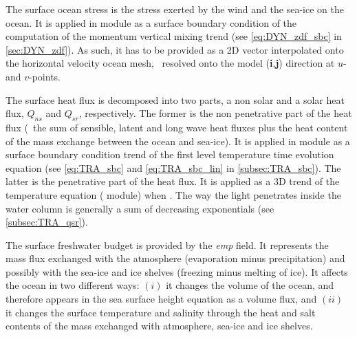 \documentclass[../main/NEMO_manual]{subfiles}
\begin{document}
The surface ocean stress is the stress exerted by the wind and the sea-ice on the ocean.
It is applied in  module as a surface boundary condition of the computation of
the momentum vertical mixing trend (see \autoref{eq:DYN_zdf_sbc} in \autoref{sec:DYN_zdf}).
As such, it has to be provided as a 2D vector interpolated onto the horizontal velocity ocean mesh,
\ie\ resolved onto the model (\textbf{i},\textbf{j}) direction at $u$- and $v$-points.

The surface heat flux is decomposed into two parts, a non solar and a solar heat flux,
$Q_{ns}$ and $Q_{sr}$, respectively.
The former is the non penetrative part of the heat flux
(\ie\ the sum of sensible, latent and long wave heat fluxes plus
the heat content of the mass exchange between the ocean and sea-ice).
It is applied in  module as a surface boundary condition trend of
the first level temperature time evolution equation
(see \autoref{eq:TRA_sbc} and \autoref{eq:TRA_sbc_lin} in \autoref{subsec:TRA_sbc}).
The latter is the penetrative part of the heat flux.
It is applied as a 3D trend of the temperature equation ( module) when
.
The way the light penetrates inside the water column is generally a sum of decreasing exponentials
(see \autoref{subsec:TRA_qsr}).

The surface freshwater budget is provided by the \textit{emp} field.
It represents the mass flux exchanged with the atmosphere (evaporation minus precipitation) and
possibly with the sea-ice and ice shelves (freezing minus melting of ice).
It affects the ocean in two different ways:
$(i)$  it changes the volume of the ocean, and therefore appears in the sea surface height equation as		%
a volume flux, and
$(ii)$ it changes the surface temperature and salinity through the heat and salt contents of
the mass exchanged with atmosphere, sea-ice and ice shelves.

\end{document}
